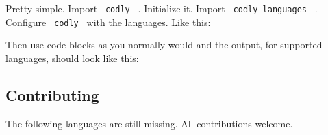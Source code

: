 Pretty simple. Import \texttt{\ codly\ } . Initialize it. Import
\texttt{\ codly-languages\ } . Configure \texttt{\ codly\ } with the
languages. Like this:

\begin{Shaded}
\begin{Highlighting}[]

\end{Highlighting}
\end{Shaded}

Then use code blocks as you normally would and the output, for supported
languages, should look like this:


\subsection{Contributing}\label{contributing}

The following languages are still missing. All contributions welcome.

